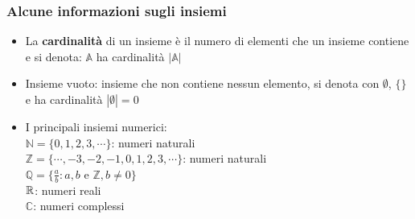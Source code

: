 \documentclass{article}
\begin{document}
\subsubsection*{Alcune informazioni sugli insiemi}
\begin{itemize}
	\item La \textbf{cardinalità} di un insieme è il numero di elementi che un insieme contiene e si denota: $\mathbb{A}$ ha cardinalità $|\mathbb{A}|$
	\item Insieme vuoto: insieme che non contiene nessun elemento, si denota con $\emptyset$, $\{\}$ e ha cardinalità $|\emptyset|=0$
	\item I principali insiemi numerici:\\
		  $\mathbb{N}=\{0,1,2,3,\cdots\}$: numeri naturali\\
		  $\mathbb{Z}=\{\cdots,-3,-2,-1,0,1,2,3,\cdots\}$: numeri naturali\\
		  $\mathbb{Q}=\{\frac{a}{b}:a,b$ e $\mathbb{Z},b\not=0\}$\\
		  $\mathbb{R}$: numeri reali\\
		  $\mathbb{C}$: numeri complessi
\end{itemize}
\end{document}

